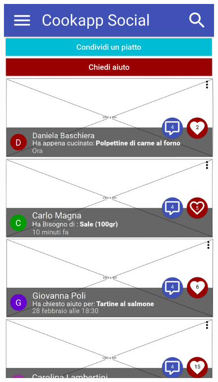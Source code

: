 \begin{figure}[H]
\begin{minipage}{.49\textwidth}
		\includegraphics[width=\textwidth]{img/wireframe/homepage_social.png}
	\end{minipage}
\end{figure}

